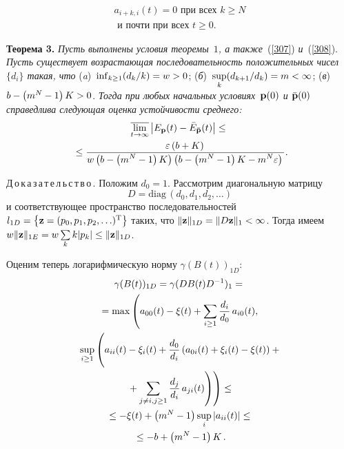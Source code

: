 \begin{multicols}{2}
\vspace*{-6pt}

\noindent
\begin{multline}
a_{i+k,i}(t) = 0  \mbox { при всех } k \ge N\\
\mbox { и почти при всех } t \ge 0.
\label{308}
\end{multline}

\smallskip

\noindent
\textbf{Теорема 3.} \textit{Пусть выполнены условия теоремы~$1$, 
а также}~(\ref{307}) \textit{и}~(\ref{308}). \textit{Пусть существует воз\-рас\-та\-ющая 
последовательность положительных чисел $\{d_i\}$ такая, что} 
(\textit{a})~$\inf_{k \hm\ge 1}({d_k}/{k})\hm=w>0$; 
(\textit{б})~$\sup\limits_{k}({d_{k+1}}/{d_k}) \hm=m \hm< \infty$;
(\textit{в})~$b \hm- \left(m^N-1\right)K \hm>0$. 
\textit{Тогда при любых начальных условиях~${\bf p}(0)$ 
и $\bar{\bf p}(0)$ справедлива сле\-ду\-ющая оценка устойчивости среднего:}
\begin{multline*}
\overline{\lim\limits_{t \to \infty}} \left|E_{\bf p}(t)- \bar{E}_{\bf \bar{p}}(t)\right| \le{}\\
{}\le  \displaystyle\frac{\displaystyle \varepsilon\left(b+K\right)\mathstrut}{\displaystyle w\left(b - \left(m^N-1\right)K\right)\left(b - \left(m^N-1\right)K- m^N\varepsilon\right)\mathstrut}.
\hspace*{-1.62909pt}
\end{multline*}


\noindent
Д\,о\,к\,а\,з\,а\,т\,е\,л\,ь\,с\,т\,в\,о\,.  
Положим $d_0=1$. Рассмотрим диагональную матрицу
\begin{equation*}
D=\mathrm{diag}\,\left(d_0, d_1, d_2, \dots \right)  
\end{equation*}
и соответствующее пространство последовательностей 
$l_{1D}=\left\{{\bf z} \hm=(p_0,p_1,p_2,\ldots)^{\mathrm{T}}\right\}$ таких, 
что $\|{\bf z}\|_{1D}\hm=\|D {\bf z}\|_1 \hm<\infty$. Тогда имеем 
$w\|{\bf z}\|_{1E} \hm= w\sum\limits_k k|p_k| \hm\le \|{\bf z}\|_{1D}$.

Оценим теперь логарифмическую норму $\gamma(B(t))_{1D}$:
\begin{multline*}
\gamma(B(t))_{1D} = \gamma(DB(t)D^{-1})_{1} = {}\\
{}=
\max\left(a_{00}(t)-\xi(t) + \sum\limits_{i \ge 1} \fr{d_i}{d_0}\,a_{i0}(t),\right.  \\\
\left.\sup_{i\ge 1}\left(
\vphantom{\sum_{j\neq i,j\ge 1}}
a_{ii}(t)-\xi_i(t)+ \fr{d_0}{d_i}\left(a_{0i}(t) + \xi_i(t) 
- \xi(t)\right) + {}\right.\right.\\
\left.\left.{}+\sum_{j\neq i,j\ge 1} \fr{d_j}{d_i}\,a_{ji}(t)\right)\right) \le {}\\
{}\le -\xi(t) + \left(m^N-1\right)\sup\limits_{i}|a_{ii}(t)| \le{}\\
{}\le  -b + \left(m^N-1\right)K\,. 
\end{multline*}


\end{multicols}
